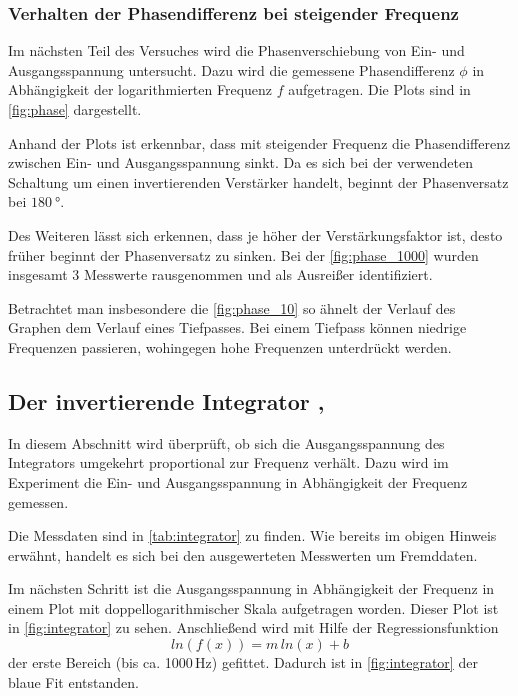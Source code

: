 \subsubsection{Verhalten der Phasendifferenz bei steigender Frequenz}
Im nächsten Teil des Versuches wird die Phasenverschiebung von Ein- und Ausgangsspannung 
untersucht.
Dazu wird die gemessene Phasendifferenz $\phi$ in Abhängigkeit der logarithmierten Frequenz $f$
aufgetragen.
Die Plots sind in \autoref{fig:phase} dargestellt.

Anhand der Plots ist erkennbar, dass mit steigender Frequenz die Phasendifferenz zwischen 
Ein- und Ausgangsspannung sinkt.
Da es sich bei der verwendeten Schaltung um einen invertierenden Verstärker handelt, beginnt 
der Phasenversatz bei $\SI{180}{\degree}$.

Des Weiteren lässt sich erkennen, dass je höher der Verstärkungsfaktor ist, desto früher
beginnt der Phasenversatz zu sinken. 
Bei der \autoref{fig:phase_1000} wurden insgesamt 3 Messwerte rausgenommen und 
als Ausreißer identifiziert.

Betrachtet man insbesondere die \autoref{fig:phase_10} so ähnelt der Verlauf
des Graphen dem Verlauf eines Tiefpasses.
Bei einem Tiefpass können niedrige Frequenzen passieren, wohingegen hohe Frequenzen
unterdrückt werden.

\subsection{Der invertierende Integrator \cite{int_data}, \cite{int_picture}}
In diesem Abschnitt wird überprüft, ob sich die Ausgangsspannung des Integrators umgekehrt proportional 
zur Frequenz verhält. %
Dazu wird im Experiment die Ein- und Ausgangsspannung in Abhängigkeit der Frequenz gemessen.

Die Messdaten sind in \autoref{tab:integrator} zu finden. 
Wie bereits im obigen Hinweis erwähnt, handelt es sich bei den ausgewerteten Messwerten
um Fremddaten.

Im nächsten Schritt ist die Ausgangsspannung in Abhängigkeit der Frequenz in einem Plot
mit doppellogarithmischer Skala aufgetragen worden.
Dieser Plot ist in \autoref{fig:integrator} zu sehen.
Anschließend wird mit Hilfe der Regressionsfunktion
\begin{equation*}
    ln(f(x)) =  m\,ln(x) + b
\end{equation*}
der erste Bereich (bis ca. 1000\,Hz) gefittet.
Dadurch ist in \autoref{fig:integrator} der blaue Fit entstanden.

